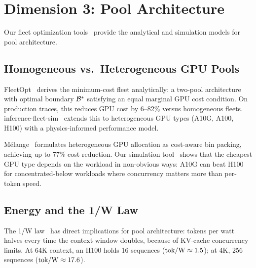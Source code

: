 \section{Dimension 3: Pool Architecture}
\label{sec:pool}

Our fleet optimization tools~\cite{fleetopt2026, fleetsim2026,
onewlaw2026} provide the analytical and simulation models for pool
architecture.

\subsection{Homogeneous vs.\ Heterogeneous GPU Pools}
\label{sec:pool:homo-hetero}

FleetOpt~\cite{fleetopt2026} derives the minimum-cost fleet
analytically: a two-pool architecture with optimal boundary
$\mathcal{B}^*$ satisfying an equal marginal GPU cost condition.  On
production traces, this reduces GPU cost by 6--82\% versus
homogeneous fleets.  inference-fleet-sim~\cite{fleetsim2026} extends
this to heterogeneous GPU types (A10G, A100, H100) with a
physics-informed performance model.

M\'{e}lange~\cite{griggs2024melange} formulates heterogeneous GPU
allocation as cost-aware bin packing, achieving up to 77\% cost
reduction.  Our simulation tool~\cite{fleetsim2026} shows that the
cheapest GPU type depends on the workload in non-obvious ways:
A10G can beat H100 for concentrated-below workloads where
concurrency matters more than per-token speed.


\subsection{Energy and the 1/W Law}
\label{sec:pool:energy}

The 1/W law~\cite{onewlaw2026} has direct implications for pool
architecture: tokens per watt halves every time the context window
doubles, because of KV-cache concurrency limits.  At 64K
context, an H100 holds 16 sequences ($\operatorname{tok/W} \approx 1.5$); at 4K,
256 sequences ($\operatorname{tok/W} \approx 17.6$).

